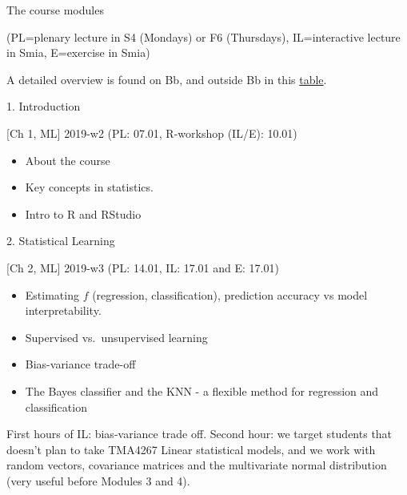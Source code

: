 \documentclass[ignorenonframetext,]{beamer}
\providecommand{\tightlist}{%
  \setlength{\itemsep}{0pt}\setlength{\parskip}{0pt}}
\begin{document}
\begin{frame}{The course modules}

(PL=plenary lecture in S4 (Mondays) or F6 (Thursdays), IL=interactive
lecture in Smia, E=exercise in Smia)

A detailed overview is found on Bb, and outside Bb in this
\href{https://www.math.ntnu.no/emner/TMA4268/2019v/table2019.html}{table}.

\begin{block}{1. Introduction}

{[}Ch 1, ML{]} 2019-w2 (PL: 07.01, R-workshop (IL/E): 10.01)

\begin{itemize}
\tightlist
\item
  About the course
\item
  Key concepts in statistics.
\item
  Intro to R and RStudio
\end{itemize}

\end{block}

\end{frame}

\begin{frame}

\begin{block}{2. Statistical Learning}

{[}Ch 2, ML{]} 2019-w3 (PL: 14.01, IL: 17.01 and E: 17.01)

\begin{itemize}
\tightlist
\item
  Estimating \(f\) (regression, classification), prediction accuracy vs
  model interpretability.
\item
  Supervised vs.~unsupervised learning
\item
  Bias-variance trade-off
\item
  The Bayes classifier and the KNN - a flexible method for regression
  and classification
\end{itemize}

First hours of IL: bias-variance trade off. Second hour: we target
students that doesn't plan to take TMA4267 Linear statistical models,
and we work with random vectors, covariance matrices and the
multivariate normal distribution (very useful before Modules 3 and 4).

\end{block}

\end{frame}
\end{document}
